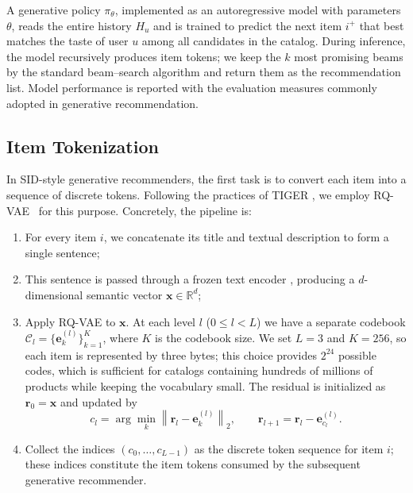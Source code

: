 A generative policy $\pi_\theta$, implemented as an autoregressive model with parameters $\theta$, reads the entire history $H_u$ and is trained to predict the next item $i^{+}$ that best matches the taste of user $u$ among all candidates in the catalog.  
During inference, the model recursively produces item tokens; we keep the $k$ most promising beams by the standard beam–search algorithm and return them as the recommendation list.  
Model performance is reported with the evaluation measures commonly adopted in generative recommendation.


\subsection{Item Tokenization} \label{sec:tokenization}

In SID-style generative recommenders, the first task is to convert each item into a sequence of discrete tokens. Following the practices of TIGER \citep{TIGER}, we employ RQ-VAE~\citep{rqvae} for this purpose. %
Concretely, the pipeline is:

\begin{enumerate}
    \item For every item $i$, we concatenate its title and textual description to form a single sentence;  
    \item This sentence is passed through a frozen text encoder \citep{AlphaRec}, producing a $d$-dimensional semantic vector $\mathbf{x}\in\mathbb{R}^{d}$;  
    \item Apply RQ-VAE to $\mathbf{x}$. At each level $l$ ($0\le l<L$) we have a separate codebook $\mathcal{C}_l=\{\mathbf{e}^{(l)}_{k}\}_{k=1}^{K}$, where $K$ is the codebook size. We set $L{=}3$ and $K{=}256$, so each item is represented by three bytes; this choice provides $2^{24}$ possible codes, which is sufficient for catalogs containing hundreds of millions of products while keeping the vocabulary small. The residual is initialized as $\mathbf{r}_{0}=\mathbf{x}$ and updated by
    \[
       c_l=\arg\min_{k}\left\|\mathbf{r}_l-\mathbf{e}^{(l)}_{k}\right\|_2,\qquad 
       \mathbf{r}_{l+1}=\mathbf{r}_l-\mathbf{e}^{(l)}_{c_{l}}.
    \]
    \item Collect the indices $(c_0,\dots,c_{L-1})$ as the discrete token sequence for item $i$; these indices constitute the item tokens consumed by the subsequent generative recommender.
\end{enumerate}

